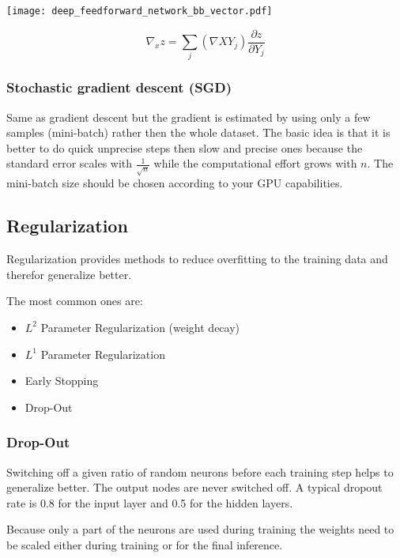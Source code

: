 \begin{center}
    \texttt{[image: deep\_feedforward\_network\_bb\_vector.pdf]}
\end{center}

\begin{equation*}
    \nabla_x z = \sum_{j}(\nabla X Y_j)\frac{\partial z}{\partial Y_j}
\end{equation*}

\subsubsection{Stochastic gradient descent (SGD)}

Same as gradient descent but the gradient is estimated by using only a few samples (mini-batch) rather then the whole dataset. The basic idea is that it is better to do quick unprecise steps then slow and precise ones because the standard error scales with $\frac{1}{\sqrt{n}}$ while the computational effort grows with $n$. The mini-batch size should be chosen according to your GPU capabilities.

\subsection{Regularization}

Regularization provides methods to reduce overfitting to the training data and therefor generalize better.

The most common ones are:
\begin{itemize}
    \item $L^2$ Parameter Regularization (weight decay)
    \item $L^1$ Parameter Regularization
    \item Early Stopping
    \item Drop-Out
\end{itemize}

\subsubsection{Drop-Out}

Switching off a given ratio of random neurons before each training step helps to generalize better. The output nodes are never switched off. A typical dropout rate is 0.8 for the input layer and 0.5 for the hidden layers.

\newpar{}

Because only a part of the neurons are used during training the weights need to be scaled either during training or for the final inference.

